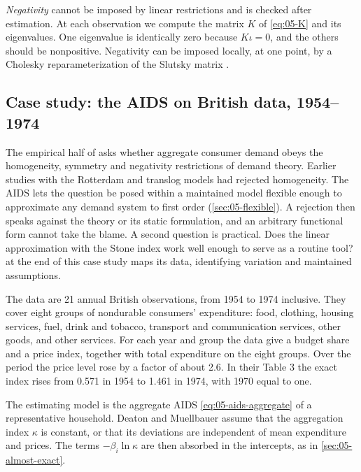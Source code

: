 \emph{Negativity} cannot be imposed by linear restrictions and is checked after estimation. At each
observation we compute the matrix $K$ of \eqref{eq:05-K} and its eigenvalues. One eigenvalue is
identically zero because $K\iota = 0$, and the others should be nonpositive. Negativity can be imposed
locally, at one point, by a Cholesky reparameterization of the Slutsky matrix \citep{Lau1978,Moschini1999}.

\subsection{Case study: the AIDS on British data, 1954--1974}\label{sec:05-dm-application}

The empirical half of \citet{DeatonMuellbauer1980a} asks whether aggregate consumer demand obeys the
homogeneity, symmetry and negativity restrictions of demand theory. Earlier studies with the Rotterdam and
translog models had rejected homogeneity. The AIDS lets the question be posed within a maintained model
flexible enough to approximate any demand system to first order (\cref{sec:05-flexible}). A rejection
then speaks against the theory or its static formulation, and an arbitrary functional form cannot take
the blame. A second question is practical. Does the linear approximation with the Stone
index work well enough to serve as a routine tool?  at the end of this case study maps
its data, identifying variation and maintained assumptions.

The data are 21 annual British observations, from 1954 to 1974 inclusive. They cover eight groups of
nondurable consumers' expenditure: food, clothing, housing services, fuel, drink and tobacco, transport
and communication services, other goods, and other services. For each year and group the data give a
budget share and a price index, together with total expenditure on the eight groups. Over the period the
price level rose by a factor of about 2.6. In their Table 3 the exact index rises from 0.571 in 1954 to
1.461 in 1974, with 1970 equal to one.

The estimating model is the aggregate AIDS \eqref{eq:05-aids-aggregate} of a representative household. Deaton
and Muellbauer assume that the aggregation index $\kappa$ is constant, or that its deviations are
independent of mean expenditure and prices. The terms $-\beta_i\ln\kappa$ are then absorbed in the
intercepts, as in \cref{sec:05-almost-exact}.

